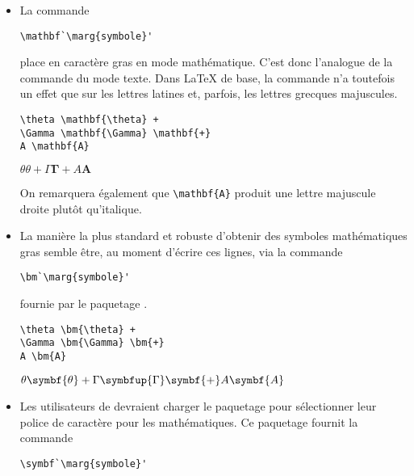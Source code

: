 \begin{itemize}
\item La commande
\begin{lstlisting}
\mathbf`\marg{symbole}'
\end{lstlisting}
  place  en caractère gras en mode mathématique. C'est
  donc l'analogue de la commande \cmd{\textbf} du mode texte. Dans
  {\LaTeX} de base, la commande n'a toutefois un effet que sur les
  lettres latines et, parfois, les lettres grecques majuscules.
  \begin{demo}
    \begin{texample}[0.6\linewidth]
\begin{lstlisting}
\theta \mathbf{\theta} +
\Gamma \mathbf{\Gamma} \mathbf{+}
A \mathbf{A}
\end{lstlisting}
    \producing
    $\theta {\theta} + \Gamma \symbf{\Gamma} {+} A \symbf{A}$
    \end{texample}
  \end{demo}
  On remarquera également que \verb=\mathbf{A}= produit une lettre
  majuscule droite plutôt qu'italique.
\item La manière la plus standard et robuste d'obtenir des symboles
  mathématiques gras semble être, au moment d'écrire ces lignes, via
  la commande
\begin{lstlisting}
\bm`\marg{symbole}'
\end{lstlisting}
  fournie par le paquetage  \citep{bm}.
\begin{demo}
    \begin{texample}[0.6\linewidth]
\begin{lstlisting}
\theta \bm{\theta} +
\Gamma \bm{\Gamma} \bm{+}
A \bm{A}
\end{lstlisting}
    \producing
    $\theta \symbf{\theta} + \Gamma \symbfup{\Gamma} \symbf{+} A
    \symbf{A}$
    \end{texample}
  \end{demo}
\item Les utilisateurs de {\XeLaTeX} devraient charger le paquetage
   \citep{unicode-math} pour sélectionner leur
  police de caractère pour les mathématiques. Ce paquetage fournit la
  commande
\begin{lstlisting}
\symbf`\marg{symbole}'

\end{lstlisting}
\end{itemize}
